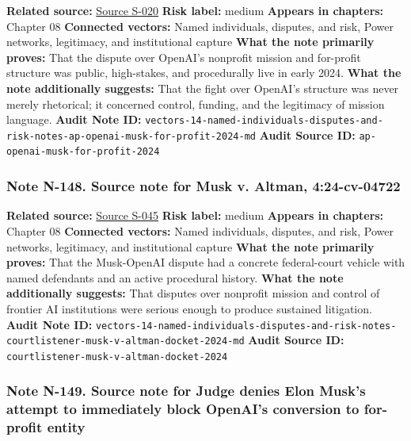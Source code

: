 \documentclass[
  american,
  11pt,
  letterpaper,
]{article}
\begin{document}
\textbf{Related source:}
\hyperref[source-s-020-openai-says-musk-agreed-the-chatgpt-maker-should-become-a-for-profit-company]{Source
S-020} \textbf{Risk label:} medium \textbf{Appears in chapters:} Chapter
08 \textbf{Connected vectors:} Named individuals, disputes, and risk,
Power networks, legitimacy, and institutional capture \textbf{What the
note primarily proves:} That the dispute over OpenAI's nonprofit mission
and for-profit structure was public, high-stakes, and procedurally live
in early 2024. \textbf{What the note additionally suggests:} That the
fight over OpenAI's structure was never merely rhetorical; it concerned
control, funding, and the legitimacy of mission language. \textbf{Audit
Note ID:}
\texttt{vectors-14-named-individuals-disputes-and-risk-notes-ap-openai-musk-for-profit-2024-md}
\textbf{Audit Source ID:} \texttt{ap-openai-musk-for-profit-2024}

\subsubsection{Note N-148. Source note for Musk v. Altman,
4:24-cv-04722}\label{note-n-148-vectors-14-named-individuals-disputes-and-risk-notes-courtlistener-musk-v-altman-docket-2024-md}

\textbf{Related source:}
\hyperref[source-s-045-musk-v-altman-4-24-cv-04722]{Source S-045}
\textbf{Risk label:} medium \textbf{Appears in chapters:} Chapter 08
\textbf{Connected vectors:} Named individuals, disputes, and risk, Power
networks, legitimacy, and institutional capture \textbf{What the note
primarily proves:} That the Musk-OpenAI dispute had a concrete
federal-court vehicle with named defendants and an active procedural
history. \textbf{What the note additionally suggests:} That disputes
over nonprofit mission and control of frontier AI institutions were
serious enough to produce sustained litigation. \textbf{Audit Note ID:}
\texttt{vectors-14-named-individuals-disputes-and-risk-notes-courtlistener-musk-v-altman-docket-2024-md}
\textbf{Audit Source ID:}
\texttt{courtlistener-musk-v-altman-docket-2024}

\subsubsection{Note N-149. Source note for Judge denies Elon Musk's
attempt to immediately block OpenAI's conversion to for-profit
entity}\label{note-n-149-vectors-14-named-individuals-disputes-and-risk-notes-ft-musk-openai-injunction-denied-2025-md}
\end{document}
